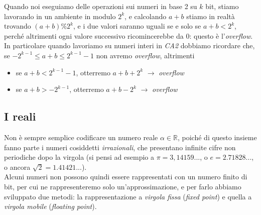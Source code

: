 \documentclass[class=book, crop=false]{standalone}
\begin{document}
Quando noi eseguiamo delle operazioni sui numeri in base 2 su $k$ bit, stiamo lavorando in un ambiente in modulo $2^{k}$, e calcolando $a+b$ stiamo in realtà trovando $(a+b)\%2^{k}$, e i due valori saranno uguali se e solo se $a+b<2^{k}$, perché altrimenti ogni valore successivo ricomincerebbe da 0: questo è l'\emph{overflow}.\\
In particolare quando lavoriamo su numeri interi in \emph{CA2} dobbiamo ricordare che, se $-2^{k-1}\le a+b\le 2^{k-1}-1$ non avremo \emph{overflow}, altrimenti
\begin{itemize}[noitemsep,nolistsep]
	\item se $a+b<2^{k-1}-1$, otterremo $a+b+2^{k}$ $\longrightarrow$ \emph{overflow}
	\item se $a+b>-2^{k-1}$, otterremo $a+b-2^{k}$ $\longrightarrow$ \emph{overflow}
\end{itemize}

\subsection{I reali} Non è sempre semplice codificare un numero reale $\alpha \in \mathbb{R}$, poiché di questo insieme fanno parte i numeri cosiddetti \emph{irrazionali}, che presentano infinite cifre non periodiche dopo la virgola (si pensi ad esempio a $\pi=3,14159...$, o $e=2.71828...$, o ancora $\sqrt{2}=1.41421...$).\\
Alcuni numeri non possono quindi essere rappresentati con un numero finito di bit, per cui ne rappresenteremo solo un'approssimazione, e per farlo abbiamo sviluppato due metodi: la rappresentazione a \emph{virgola fissa} (\emph{fixed point}) e quella a \emph{virgola mobile} (\emph{floating point}).
\end{document}

